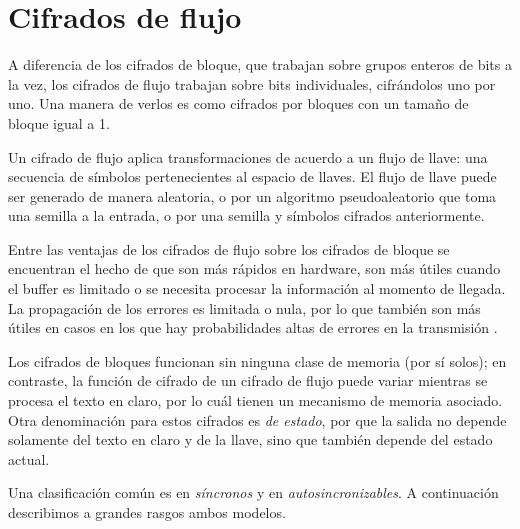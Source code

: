 %
%

\section{Cifrados de flujo}

A diferencia de los cifrados de bloque, que trabajan sobre grupos enteros de
bits a la vez, los cifrados de flujo trabajan sobre bits individuales,
cifrándolos uno por uno. Una manera de verlos es como cifrados por bloques con
un tamaño de bloque igual a 1.

Un cifrado de flujo aplica transformaciones de acuerdo a un flujo de llave:
una secuencia de símbolos pertenecientes al espacio de llaves. El flujo de
llave puede ser generado de manera aleatoria, o por un algoritmo
pseudoaleatorio que toma una semilla a la entrada, o por una semilla y
símbolos cifrados anteriormente.

Entre las ventajas de los cifrados de flujo sobre los cifrados de bloque se
encuentran el hecho de que son más rápidos en hardware, son más útiles cuando
el buffer es limitado o se necesita procesar la información al momento de
llegada. La propagación de los errores es limitada o nula, por lo que también
son más útiles en casos en los que hay probabilidades altas de errores en la
transmisión \cite{menezes}.

Los cifrados de bloques funcionan sin ninguna clase de memoria (por sí solos);
en contraste, la función de cifrado de un cifrado de flujo puede variar
mientras se procesa el texto en claro, por lo cuál tienen un mecanismo de
memoria asociado. Otra denominación para estos cifrados es \textit{de estado},
por que la salida no depende solamente del texto en claro y de la llave, sino
que también depende del estado actual.

Una clasificación común es en \textit{síncronos} y
en \textit{autosincronizables}. A continuación describimos a grandes rasgos
ambos modelos.



